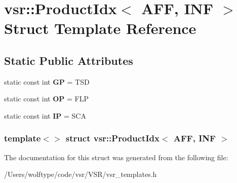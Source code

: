 \hypertarget{structvsr_1_1_product_idx_3_01_a_f_f_00_01_i_n_f_01_4}{\section{vsr\-:\-:Product\-Idx$<$ A\-F\-F, I\-N\-F $>$ Struct Template Reference}
\label{structvsr_1_1_product_idx_3_01_a_f_f_00_01_i_n_f_01_4}
}
\subsection*{Static Public Attributes}
\begin{DoxyCompactItemize}
\item 
\hypertarget{structvsr_1_1_product_idx_3_01_a_f_f_00_01_i_n_f_01_4_a40061c003f61d525947b4a071f36263a}{static const int {\bfseries G\-P} = T\-S\-D}\label{structvsr_1_1_product_idx_3_01_a_f_f_00_01_i_n_f_01_4_a40061c003f61d525947b4a071f36263a}

\item 
\hypertarget{structvsr_1_1_product_idx_3_01_a_f_f_00_01_i_n_f_01_4_a35262612157069ca7a3803584adb5e00}{static const int {\bfseries O\-P} = F\-L\-P}\label{structvsr_1_1_product_idx_3_01_a_f_f_00_01_i_n_f_01_4_a35262612157069ca7a3803584adb5e00}

\item 
\hypertarget{structvsr_1_1_product_idx_3_01_a_f_f_00_01_i_n_f_01_4_a9d915f42c056e128dca35d7ffd90b685}{static const int {\bfseries I\-P} = S\-C\-A}\label{structvsr_1_1_product_idx_3_01_a_f_f_00_01_i_n_f_01_4_a9d915f42c056e128dca35d7ffd90b685}

\end{DoxyCompactItemize}
\subsubsection*{template$<$$>$ struct vsr\-::\-Product\-Idx$<$ A\-F\-F, I\-N\-F $>$}



The documentation for this struct was generated from the following file\-:\begin{DoxyCompactItemize}
\item 
/\-Users/wolftype/code/vsr/\-V\-S\-R/vsr\-\_\-templates.\-h\end{DoxyCompactItemize}

